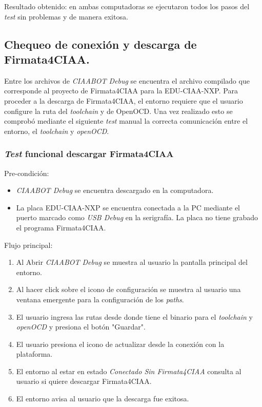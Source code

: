 Resultado obtenido: en ambas computadoras se ejecutaron todos los pasos del \emph{test} sin problemas y de manera exitosa. 


\subsection{Chequeo de conexión y descarga de Firmata4CIAA.}
\label{subsec:Chequeo de acceso a puertos serie.}

Entre los archivos de \emph{CIAABOT Debug} se encuentra el archivo compilado que corresponde al proyecto de Firmata4CIAA  para la EDU-CIAA-NXP. Para proceder a la descarga de Firmata4CIAA, el entorno requiere que el usuario configure la ruta del \emph{toolchain} y de OpenOCD. Una vez realizado esto se comprobó mediante el siguiente \emph{test} manual la correcta comunicación entre el entorno, el \emph{toolchain} y \emph{openOCD}.

\subsubsection{\emph{Test} funcional descargar Firmata4CIAA}
Pre-condición:
\begin{itemize}
	\item
	\emph{CIAABOT Debug} se encuentra descargado en la computadora.
	\item
	La placa EDU-CIAA-NXP se encuentra conectada a la PC mediante el puerto marcado como \emph{USB Debug} en la serigrafía. La placa no tiene grabado el programa Firmata4CIAA.
\end{itemize}
Flujo principal:
\begin{enumerate}
	\item
	Al Abrir \emph{CIAABOT Debug} se muestra al usuario la pantalla principal del entorno.
	\item
    Al hacer click sobre el icono de configuración se muestra al usuario una ventana emergente para la configuración de los \emph{paths}.
	\item
	El usuario ingresa las rutas desde donde tiene el binario para el \emph{toolchain} y \emph{openOCD} y presiona el botón "Guardar".
	\item
	El usuario presiona el icono de actualizar desde la conexión con la plataforma.
	\item
	El entorno al estar en estado \emph{Conectado Sin Firmata4CIAA} consulta al usuario si quiere descargar Firmata4CIAA.
	\item
	El entorno avisa al usuario que la descarga fue exitosa.
\end{enumerate}

